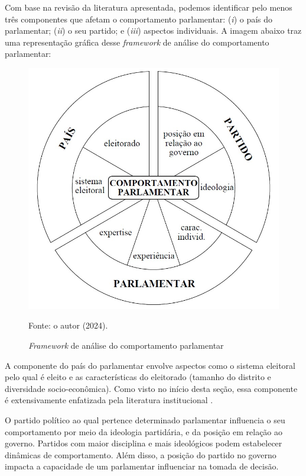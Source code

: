 Com base na revisão da literatura apresentada, podemos identificar pelo menos três componentes que afetam o comportamento parlamentar: (\textit{i}) o país do parlamentar; (\textit{ii}) o seu partido; e (\textit{iii}) aspectos individuais. A imagem abaixo traz uma representação gráfica desse \textit{framework} de análise do comportamento parlamentar:

    \begin{figure}[htbp]
        \centering
        \caption{\textit{Framework} de análise do comportamento parlamentar}
        \includegraphics[width=\textwidth]{imgs/framework_compt_parlamentar.jpg}
        \label{fig:framework}
        
        Fonte: o autor (2024).
    \end{figure}
    
    A componente do país do parlamentar envolve aspectos como o sistema eleitoral pelo qual é eleito e as características do eleitorado (tamanho do distrito e diversidade socio-econômica). Como visto no início desta seção, essa componente é extensivamente enfatizada pela literatura institucional \cite{mayhew2024congress}.
    
    O partido político ao qual pertence determinado parlamentar influencia o seu comportamento por meio da ideologia partidária, e da posição em relação ao governo. Partidos com maior disciplina e mais ideológicos podem estabelecer dinâmicas de comportamento. Além disso, a posição do partido no governo impacta a capacidade de um parlamentar influenciar na tomada de decisão.
    
